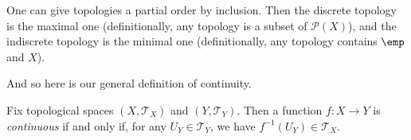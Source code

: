 \documentclass[../notes.tex]{subfiles}
\begin{document}
\begin{remark}
	One can give topologies a partial order by inclusion. Then the discrete topology is the maximal one (definitionally, any topology is a subset of $\mathcal P(X)$), and the indiscrete topology is the minimal one (definitionally, any topology contains $\emp$ and $X$).
\end{remark}
And so here is our general definition of continuity.
\begin{definition}[Continuous]
	Fix topological spaces $(X,\mathcal T_X)$ and $(Y,\mathcal T_Y)$. Then a function $f\colon X\to Y$ is \textit{continuous} if and only if, for any $U_Y\in\mathcal T_Y$, we have $f^{-1}(U_Y)\in\mathcal T_X$.
\end{definition}
\end{document}
